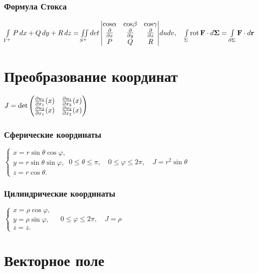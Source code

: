 \subsubsection{Формула Стокса}
${\int \limits _{\Gamma ^{+}}{P\,dx+Q\,dy+R\,dz}} = \iint \limits _{S^{+}}{det \begin{vmatrix}\rm{cos}\alpha &\rm{cos}\beta&\rm{cos}\gamma\\ \frac {\partial}{\partial x}&\frac {\partial}{\partial y}&\frac {\partial}{\partial z}\\P&Q&R\end{vmatrix}}dudv, \quad \int \limits _{\Sigma }{\mathrm  {rot}}\,{\mathbf  {F}}\cdot d{\mathbf  {\Sigma }}=\int \limits _{{\partial \Sigma }}{\mathbf  {F}}\cdot d{\mathbf  {r}}$

\section{Преобразование координат}

$J = \det {\begin{pmatrix}{\frac{\partial{u_{1}}}{\partial{x_{1}}}}(x)&{\frac{\partial{u_{1}}}{\partial{x_{2}}}}(x)\\{\frac{\partial{u_{2}}}{\partial{x_{1}}}}(x)&{\frac{\partial{u_{2}}}{\partial{x_{2}}}}(x)\end{pmatrix}}$

\subsubsection{Сферические координаты} 

${\begin{cases}x=r\sin \theta \cos \varphi ,\\y=r\sin \theta \sin \varphi ,\\z=r\cos \theta .\end{cases}} 0 \le \theta \le \pi, \quad 0 \le \varphi \le 2\pi, \quad J=r^{2}\sin \theta $

\subsubsection{Цилиндрические координаты}
${\begin{cases}x=\rho \cos \varphi ,\\y=\rho \sin \varphi ,\\z=z.\end{cases}} \quad 0 \le \varphi \le 2\pi, \quad J = \rho$


\section{Векторное поле}

